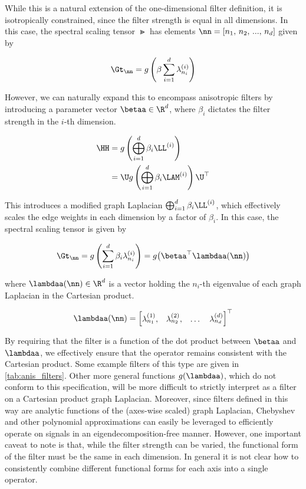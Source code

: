 While this is a natural extension of the one-dimensional filter definition, it is isotropically constrained, since the filter strength is equal in all dimensions. In this case, the spectral scaling tensor $\Gt$ has elements $\nn = [n_1,\, n_2,\, ...,\, n_d]$ given by  

\begin{equation}
    \label{eq:Gn_dd1}
    \Gt_{\nn} = g\left(\beta\sum_{i=1}^d \lambda^{(i)}_{n_i}\right)
\end{equation}


However, we can naturally expand this to encompass anisotropic filters by introducing a parameter vector $\betaa \in \R^d$, where $\beta_i$ dictates the filter strength in the $i$-th dimension. 

\begin{align}
    \HH &= g\left( \bigoplus_{i=1}^d  \beta_i \LL^{(i)}\right)  \notag \\
        &= \U g\left( \bigoplus_{i=1}^d  \beta_i \LAM^{(i)}\right) \U^\top
\end{align}

This introduces a modified graph Laplacian $\bigoplus_{i=1}^d  \beta_i \LL^{(i)}$, which effectively scales the edge weights in each dimension by a factor of $\beta_i$. In this case, the spectral scaling tensor is given by 

\begin{equation}
    \label{eq:Gn_dd2}
    \Gt_{\nn} = g\left(\sum_{i=1}^d \beta_i \lambda^{(i)}_{n_i}\right) = g\big(\betaa^\top \lambdaa(\nn)\big)
\end{equation}

where $\lambdaa(\nn) \in \R^d$ is a vector holding the $n_i$-th eigenvalue of each graph Laplacian in the Cartesian product. 

\begin{equation}
    \label{eq:lam_of_n}
\lambdaa(\nn) = 
\begin{bmatrix}
    \lambda^{(1)}_{n_1}, & \lambda^{(2)}_{n_2}, & \dots & \lambda^{(d)}_{n_d}    
\end{bmatrix}^\top
\end{equation}

By requiring that the filter is a function of the dot product between $\betaa$ and $\lambdaa$, we effectively ensure that the operator remains consistent with the Cartesian product. Some example filters of this type are given in \cref{tab:anis_filters}. Other more general functions $g(\lambdaa)$, which do not conform to this specification, will be more difficult to strictly interpret as a filter on a Cartesian product graph Laplacian. Moreover, since filters defined in this way are analytic functions of the (axes-wise scaled) graph Laplacian, Chebyshev and other polynomial approximations can easily be leveraged to efficiently operate on signals in an eigendecomposition-free manner. However, one important caveat to note is that, while the filter strength can be varied, the functional form of the filter must be the same in each dimension. In general it is not clear how to consistently combine different functional forms for each axis into a single operator. 


